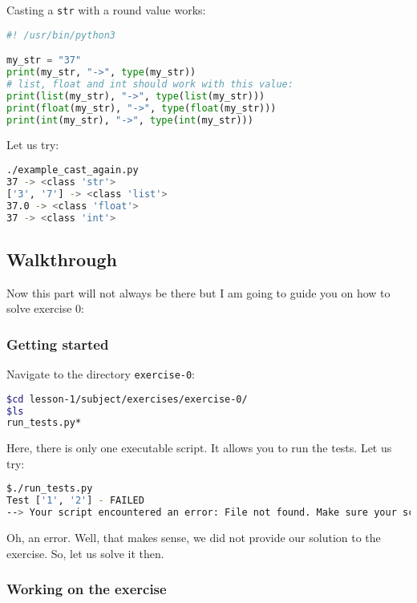 \documentclass[12pt]{article}
\begin{document}
Casting a \texttt{str} with a round value works:

\begin{lstlisting}[language=python,style=codestyle,title=example\_cast\_again.py]
#! /usr/bin/python3

my_str = "37"
print(my_str, "->", type(my_str))
# list, float and int should work with this value:
print(list(my_str), "->", type(list(my_str)))
print(float(my_str), "->", type(float(my_str)))
print(int(my_str), "->", type(int(my_str)))
\end{lstlisting}

Let us try:

\begin{lstlisting}[language=bash]
./example_cast_again.py 
37 -> <class 'str'>
['3', '7'] -> <class 'list'>
37.0 -> <class 'float'>
37 -> <class 'int'>
\end{lstlisting}


\subsection{Walkthrough}

Now this part will not always be there but I am going to guide you on how to solve exercise 0:

\subsubsection{Getting started}
Navigate to the directory \texttt{exercise-0}:

\begin{lstlisting}[language=bash]
$cd lesson-1/subject/exercises/exercise-0/
$ls
run_tests.py*
\end{lstlisting}

Here, there is only one executable script. It allows you to run the tests. Let us try:

\begin{lstlisting}[language=bash]
$./run_tests.py 
Test ['1', '2'] - FAILED
--> Your script encountered an error: File not found. Make sure your script is correctly named
\end{lstlisting}

Oh, an error. Well, that makes sense, we did not provide our solution to the exercise. So, let us solve it then.

\subsubsection{Working on the exercise}
\end{document}

